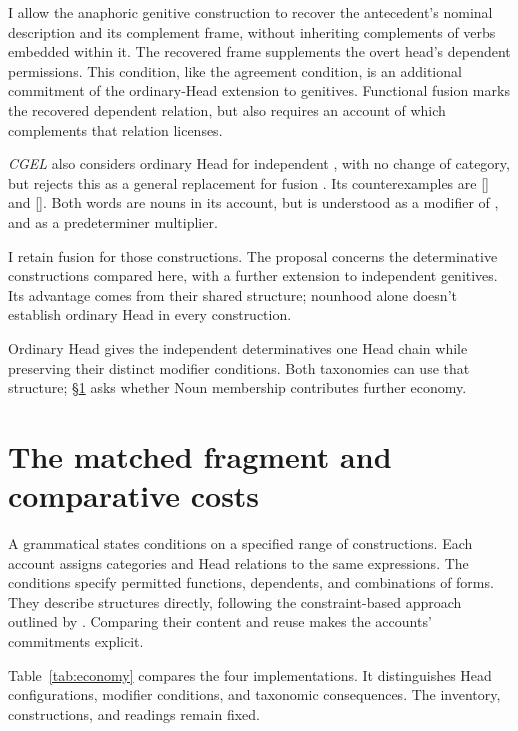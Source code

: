 \documentclass[12pt]{article}
\begin{document}
I allow the anaphoric genitive construction to recover the antecedent's nominal description and its complement frame, without inheriting complements of verbs embedded within it. The recovered frame supplements the overt head's dependent permissions. This condition, like the agreement condition, is an additional commitment of the ordinary-Head extension to genitives. Functional fusion marks the recovered dependent relation, but also requires an account of which complements that relation licenses.

\textit{CGEL} also considers ordinary Head for independent , with no change of category, but rejects this as a general replacement for fusion \citep[421]{huddleston2002}. Its counterexamples are  [] and  []. Both words are nouns in its account, but  is understood as a modifier of , and  as a predeterminer multiplier.

I retain fusion for those constructions. The proposal concerns the determinative constructions compared here, with a further extension to independent genitives. Its advantage comes from their shared structure; nounhood alone doesn't establish ordinary Head in every construction.

Ordinary Head gives the independent determinatives one Head chain while preserving their distinct modifier conditions. Both taxonomies can use that structure; §\ref{sec:economy} asks whether Noun membership contributes further economy.

\section{The matched fragment and comparative costs}\label{sec:economy}

A grammatical  states conditions on a specified range of constructions. Each account assigns categories and Head relations to the same expressions. The conditions specify permitted functions, dependents, and combinations of forms. They describe structures directly, following the constraint-based approach outlined by \textcite{pullum2020theorizing}. Comparing their content and reuse makes the accounts' commitments explicit.

Table~\ref{tab:economy} compares the four implementations. It distinguishes Head configurations, modifier conditions, and taxonomic consequences. The inventory, constructions, and readings remain fixed.
\end{document}
